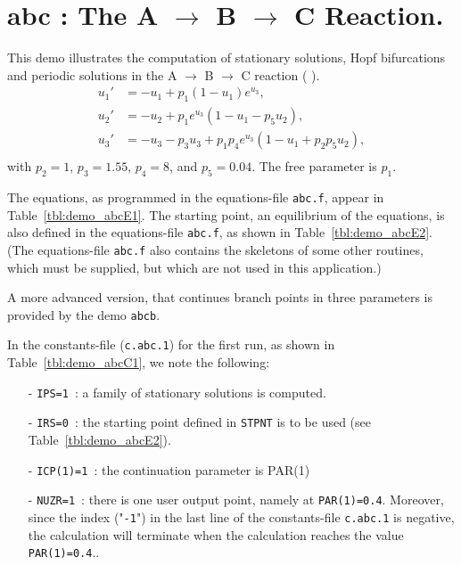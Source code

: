 \documentclass[12pt]{report}
\begin{document}
\newpage
\section{ abc : The A $\to$ B $\to$ C Reaction.} \label{sec:Demos_abc}
This demo illustrates the computation of 
stationary solutions,
Hopf bifurcations 
and
periodic solutions
in the A $\to$ B $\to$ C reaction 
( \citeyear{DoHe:83}).
\begin{equation} \begin{array}{cl}
  u_1 ' &=  -u_1 + p_1 (1-u_1) e^{u_3}, \\
  u_2 ' &=  -u_2 +  p_1 e^{u_3} ( 1-u_1 - p_5 u_2 ),\\
  u_3 ' &=  -u_3 - p_3 u_3 + p_1 p_4 e^{u_3}  
  ( 1-u_1 + p_2 p_5 u_2 ),\\ \end{array} \end{equation}
with $p_2=1$, $p_3=1.55$, $p_4=8$, and $p_5=0.04$. 
The free parameter is $p_1$.

The equations, as programmed in the equations-file {\tt abc.f},
appear in Table~\ref{tbl:demo_abcE1}.
The starting point, an equilibrium of the equations,
is also defined in  the equations-file {\tt abc.f},
as shown in  Table~\ref{tbl:demo_abcE2}.
(The equations-file {\tt abc.f} also contains the skeletons
of some other routines, which must be supplied, but which 
are not used in this application.)

A more advanced version, that continues branch points in three
parameters is provided by the demo {\tt abcb}.

In the constants-file ({\tt c.abc.1}) for the first run, as shown in 
Table~\ref{tbl:demo_abcC1}, we note the following:

\begin{itemize}
\item[-] {\tt IPS=1}~: a family of stationary solutions is computed.

\item[-] {\tt IRS=0}~: the starting point defined in {\tt STPNT} 
	 is to be used (see  Table~\ref{tbl:demo_abcE2}). 

\item[-] {\tt ICP(1)=1}~: the continuation parameter is PAR(1) 

\item[-] {\tt NUZR=1}~: there is one user output point, namely at
	 {\tt PAR(1)=0.4}. Moreover, since the index ("{\tt -1}") in
	 the last line of the constants-file {\tt c.abc.1} is negative, 
	 the calculation will terminate when the calculation reaches
	 the value {\tt PAR(1)=0.4}..
\end{itemize}
\end{document}
